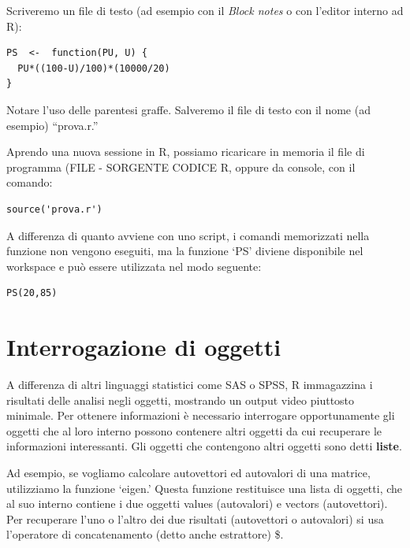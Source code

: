 \documentclass[a4paper,12pt,oneside]{book}
\begin{document}
Scriveremo un file di testo (ad esempio con il \emph{Block notes} o con l'editor interno ad R):

\begin{verbatim}
PS  <-  function(PU, U) {
  PU*((100-U)/100)*(10000/20)
}
\end{verbatim}

Notare l'uso delle parentesi graffe. Salveremo il file di testo con il nome (ad esempio) ``prova.r.''

Aprendo una nuova sessione in R, possiamo ricaricare in memoria il file di programma (FILE - SORGENTE CODICE R, oppure da console, con il comando:

\begin{verbatim}
source('prova.r')
\end{verbatim}

A differenza di quanto avviene con uno script, i comandi memorizzati nella funzione non vengono eseguiti, ma la funzione `PS' diviene disponibile nel workspace e può essere utilizzata nel modo seguente:

\begin{verbatim}
PS(20,85)
\end{verbatim}

\hypertarget{interrogazione-di-oggetti}{%
\section*{Interrogazione di oggetti}\label{interrogazione-di-oggetti}}

A differenza di altri linguaggi statistici come SAS o SPSS, R immagazzina i risultati delle analisi negli oggetti, mostrando un output video piuttosto minimale. Per ottenere informazioni è necessario interrogare opportunamente gli oggetti che al loro interno possono contenere altri oggetti da cui recuperare le informazioni interessanti. Gli oggetti che contengono altri oggetti sono detti
\textbf{liste}.

Ad esempio, se vogliamo calcolare autovettori ed autovalori di una
matrice, utilizziamo la funzione `eigen.' Questa funzione restituisce una lista di oggetti, che al suo interno contiene i due oggetti values (autovalori) e vectors (autovettori). Per recuperare l'uno o l'altro dei due risultati (autovettori o autovalori) si usa l'operatore di concatenamento (detto anche estrattore) \$.
\end{document}
